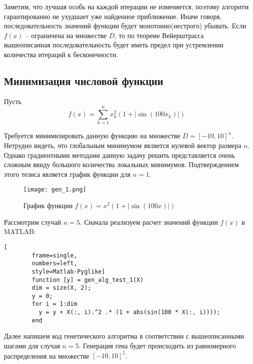 \documentclass[../main.tex]{subfiles}
\begin{document}
	Заметим, что лучшая особь на каждой итерации не изменяется, поэтому алгоритм гарантированно не ухудшает уже найденное приближение. Иначе говоря, последовательность значений функции будет монотонно(нестрого) убывать. Если $f(x)$ -- ограничена на множестве $D$, то по теореме Вейерштрасса вышеописанная последовательность будет иметь предел при устремлении количества итераций к бесконечности.
	
	
	\subsection{Минимизация числовой функции}
	
	Пусть 
	\[f(x) = \sum_{k=1}^{n}x_k^2 (1 + |\sin{(100x_k)}|)\]
	
	Требуется минимизировать данную функцию на множестве $D = [-10, 10]^n$. Нетрудно видеть, что глобальным минимумом является нулевой вектор размера $n$. Однако градиентными методами данную задачу решить представляется очень сложным ввиду большого количества локальных минимумов. Подтверждением этого тезиса является график функции для $n=1$.
	
	
	\begin{figure}[H]
		\texttt{[image: gen\_1.png]}{}
		\caption{График функции $f(x) = x^2 (1 + |\sin(100x)|)$}
		\label{fig: gen_alg_test_1}
	\end{figure}
	
	
	
	
	Рассмотрим случай $n=5$. Сначала реализуем расчет значений функции $f(x)$ в MATLAB: 
	
	\begin{lstlisting}[
		frame=single,
		numbers=left,
		style=Matlab-Pyglike]
		function [y] = gen_alg_test_1(X)
		dim = size(X, 2);
		y = 0;
		for i = 1:dim
		  y = y + X(:, i).^2 .* (1 + abs(sin(100 * X(:, i))));
		end		
	\end{lstlisting}

	Далее напишем код генетического алгоритма в соответствии с вышеописанными шагами для случая $n=5$. Генерация гена будет происходить из равномерного распределения на множестве $[-10, 10]^5$.
	
\end{document}
